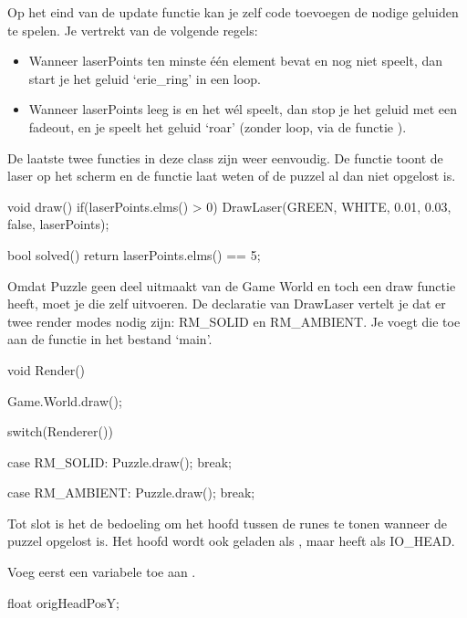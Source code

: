 Op het eind van de update functie kan je zelf code toevoegen de nodige geluiden te spelen. Je vertrekt van de volgende regels:

\begin{itemize}
	\item Wanneer laserPoints ten minste \'e\'en element bevat en  nog niet speelt, dan start je het geluid `erie\_ring' in een loop.
	\item Wanneer laserPoints leeg is en het  w\'el speelt, dan stop je het geluid met een fadeout, en je speelt het geluid `roar' (zonder loop, via de functie ).
\end{itemize}

De laatste twee functies in deze class zijn weer eenvoudig. De  functie toont de laser op het scherm en de  functie laat weten of de puzzel al dan niet opgelost is.

\begin{code}
void draw()
{
  if(laserPoints.elms() > 0)
  {
     DrawLaser(GREEN, WHITE, 0.01, 0.03, false, laserPoints);
  }     
}

bool solved()
{
  return laserPoints.elms() == 5;
}
\end{code}

Omdat Puzzle geen deel uitmaakt van de Game World en toch een draw functie heeft, moet je die zelf uitvoeren. De declaratie van DrawLaser vertelt je dat er twee render modes nodig zijn: RM\_SOLID en RM\_AMBIENT. Je voegt die toe aan de  functie in het bestand `main'.

\begin{code}
void Render()
{
   Game.World.draw();
   
   switch(Renderer())
   {
      case RM_SOLID:
      {
         Puzzle.draw();
         break;
      }
      
      case RM_AMBIENT:
      {
         Puzzle.draw();
         break;
      }
   }
}
\end{code}

Tot slot is het de bedoeling om het hoofd tussen de runes te tonen wanneer de puzzel opgelost is. Het hoofd wordt ook geladen als , maar heeft als  IO\_HEAD.

Voeg eerst een variabele toe aan .

\begin{code}
float origHeadPosY;
\end{code}

